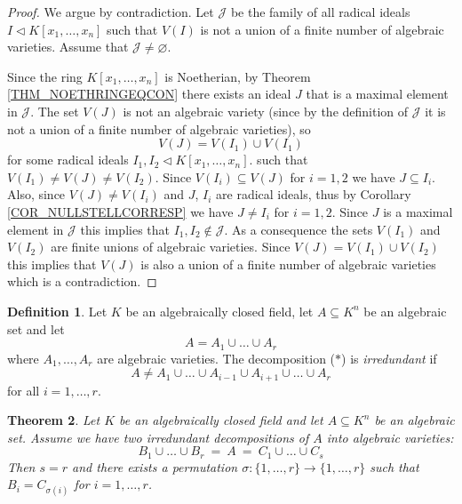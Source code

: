\documentclass[12pt, letterpaper, oneside]{article}
\theoremstyle{plain}
\newtheorem{theorem}{Theorem}[section]
\theoremstyle{definition}
\newtheorem{definition}[theorem]{Definition}
\newcommand{\vs}{\vskip 5mm}
\begin{document}
\vs

\begin{proof}
We argue by contradiction. Let $\mathcal{J}$ be the family of all radical ideals
$I\lhd K[x_{1}, \dots, x_{n}]$  such that $V(I)$ is not a union of 
a finite number of  algebraic varieties. Assume that $\mathcal{J}\neq \varnothing$.  

Since the ring $K[x_{1}, \dots, x_{n}]$ is Noetherian, by 
Theorem \ref{THM_NOETHRINGEQCON} there exists an ideal $J$ that is a 
maximal element in $\mathcal{J}$. The set 
$V(J)$ is not an algebraic variety (since  by the definition of $\mathcal{J}$ it is not a union 
of a finite number of algebraic varieties), so 
$$V(J) = V(I_{1}) \cup V(I_{1})$$ 
for some radical ideals $I_{1}, I_{2}\lhd K[x_{1}, \dots, x_{n}]$. 
such that  $V(I_{1}) \neq V(J) \neq V(I_{2})$. Since $V(I_{i})\subseteq V(J)$ for $i=1,2$ we have 
$J\subseteq I_{i}$. Also, since $V(J)\neq V(I_{i})$  and $J$, $I_{i}$ are radical ideals, thus 
by Corollary \ref{COR_NULLSTELLCORRESP} we have $J\neq I_{i}$ for $i=1, 2$. 
Since $J$ is a maximal element in $\mathcal{J}$ this implies that $I_{1}, I_{2}\not\in \mathcal{J}$. 
As a consequence the sets $V(I_{1})$ and $V(I_{2})$ are finite unions of algebraic varieties. 
Since $V(J) = V(I_{1})\cup V(I_{2})$ this implies that $V(J)$ is also a union of a finite number 
of algebraic varieties which is a contradiction.  

\end{proof}

\vs\vs

\begin{definition}
Let $K$ be an algebraically closed field, let $A\subseteq K^{n}$ be an algebraic set 
and let 
\begin{equation*}
\tag{$\ast$}
A=  A_{1}\cup \dots \cup A_{r}
\end{equation*}
where $A_{1}, \dots, A_{r}$ are algebraic varieties. The decomposition 
($\ast$) is \emph{irredundant} if 
$$A\neq A_{1} \cup \dots \cup  A_{i-1} \cup A_{i+1} \cup \dots \cup A_{r}$$
for all $i=1, \dots, r$. 
\end{definition}

\vs\vs

\begin{theorem}
Let $K$ be an algebraically closed field and let $A\subseteq K^{n}$ be an algebraic set. 
Assume we have two irredundant decompositions of $A$ into  algebraic varieties: 
$$ B_{1}\cup \dots \cup B_{r} \ =\  A \  =\   C_{1}\cup \dots \cup C_{s} $$
Then $s=r$ and there exists a permutation $\sigma \colon \{1, \dots, r\} \to \{1, \dots, r\}$
such that $B_{i} = C_{\sigma(i)}$ for $i=1, \dots, r$. 
\end{theorem}
\end{document}
